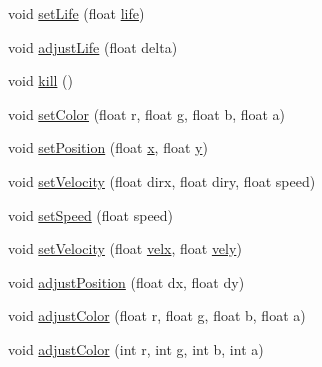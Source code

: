 \begin{DoxyCompactItemize}
\item 
void \mbox{\hyperlink{classorg_1_1newdawn_1_1slick_1_1particles_1_1_particle_a9ef44ea7b2ecae6493368a6619bdadd7}{set\+Life}} (float \mbox{\hyperlink{classorg_1_1newdawn_1_1slick_1_1particles_1_1_particle_a361d2a9d01b66d38d90496c096970aab}{life}})
\item 
void \mbox{\hyperlink{classorg_1_1newdawn_1_1slick_1_1particles_1_1_particle_a3a137a2701a6047cebf8324920cfc689}{adjust\+Life}} (float delta)
\item 
void \mbox{\hyperlink{classorg_1_1newdawn_1_1slick_1_1particles_1_1_particle_afd46aec9df92c7aeaa293fe2221146cd}{kill}} ()
\item 
void \mbox{\hyperlink{classorg_1_1newdawn_1_1slick_1_1particles_1_1_particle_ac39d04d90d44376b1063215af3086197}{set\+Color}} (float r, float g, float b, float a)
\item 
void \mbox{\hyperlink{classorg_1_1newdawn_1_1slick_1_1particles_1_1_particle_a7aaea03869505913dca81dd0c23a208f}{set\+Position}} (float \mbox{\hyperlink{classorg_1_1newdawn_1_1slick_1_1particles_1_1_particle_ae1ee7d5a72b34bbdb44110dfa2795674}{x}}, float \mbox{\hyperlink{classorg_1_1newdawn_1_1slick_1_1particles_1_1_particle_ad784e37c1fdad77abc886521b8e907b2}{y}})
\item 
void \mbox{\hyperlink{classorg_1_1newdawn_1_1slick_1_1particles_1_1_particle_a7357dac12ad0fe5293111100b6ad8c61}{set\+Velocity}} (float dirx, float diry, float speed)
\item 
void \mbox{\hyperlink{classorg_1_1newdawn_1_1slick_1_1particles_1_1_particle_aa448ce99f18e242ea920190d0c1f9b43}{set\+Speed}} (float speed)
\item 
void \mbox{\hyperlink{classorg_1_1newdawn_1_1slick_1_1particles_1_1_particle_a925553d78b2aedeb6662840a083b184f}{set\+Velocity}} (float \mbox{\hyperlink{classorg_1_1newdawn_1_1slick_1_1particles_1_1_particle_a9056abd13cffd1064051f9a34a3e70ef}{velx}}, float \mbox{\hyperlink{classorg_1_1newdawn_1_1slick_1_1particles_1_1_particle_a799a64a459185f49bcf1e71a53e59014}{vely}})
\item 
void \mbox{\hyperlink{classorg_1_1newdawn_1_1slick_1_1particles_1_1_particle_a2fc8c3eaf8740bc5a24ef4d091a2a254}{adjust\+Position}} (float dx, float dy)
\item 
void \mbox{\hyperlink{classorg_1_1newdawn_1_1slick_1_1particles_1_1_particle_af829fcadc2785440a4da6bbaf110ddee}{adjust\+Color}} (float r, float g, float b, float a)
\item 
void \mbox{\hyperlink{classorg_1_1newdawn_1_1slick_1_1particles_1_1_particle_ac1b8dd0572181812d5d6fbcea17aee30}{adjust\+Color}} (int r, int g, int b, int a)

\end{DoxyCompactItemize}

